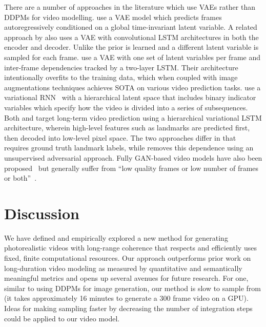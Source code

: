 There are a number of approaches in the literature which use VAEs rather than DDPMs for video modelling. \citet{babaeizadeh2017stochastic} use a VAE model which predicts frames autoregressively conditioned on a global time-invariant latent variable. A related approach by \citet{denton2018stochastic} also uses a VAE with convolutional LSTM architectures in both the encoder and decoder. Unlike \citet{babaeizadeh2017stochastic} the prior is learned and a different latent variable is sampled for each frame. \citet{babaeizadeh2021fitvid} use a VAE with one set of latent variables per frame and inter-frame dependencies tracked by a two-layer LSTM. Their architecture intentionally overfits to the training data, which when coupled with image augmentations techniques achieves SOTA on various video prediction tasks.  \citet{kim2019variational} use a variational RNN~\citep{chung2015recurrent} with a hierarchical latent space that includes binary indicator variables which specify how the video is divided into a series of subsequences. Both \citet{villegas2018hierarchical} and \citet{wichers2018learning} target long-term video prediction using a hierarchical variational LSTM architecture, wherein high-level features such as landmarks are predicted first, then decoded into low-level pixel space. The two approaches differ in that \citet{villegas2018hierarchical} requires ground truth landmark labels, while \cite{wichers2018learning} removes this dependence using an unsupervised adversarial approach. Fully GAN-based video models have also been proposed~\citep{aldausari2022video,clark2019adversarial} but generally suffer from ``low quality frames or low number of frames or both''~\citep{aldausari2022video}.

\section{Discussion}

We have defined and empirically explored a new method for generating photorealistic videos with long-range coherence that respects and efficiently uses fixed, finite computational resources.
Our approach outperforms prior work on long-duration video modeling as measured by quantitative and semantically meaningful metrics and opens up several avenues for future research.
For one, similar to using DDPMs for image generation, our method is slow to sample from (it takes approximately 16 minutes to generate a 300 frame video on a GPU).  Ideas for making sampling faster by decreasing the number of integration steps~\citep{salimans2022progressive,song2020denoising,xiao2022tackling} could be applied to our video model.  

